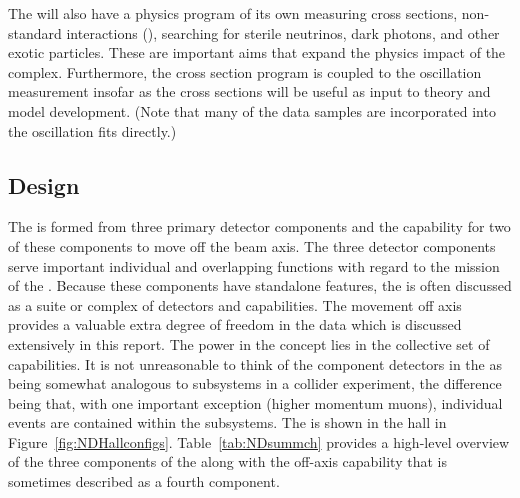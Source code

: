 The   will also have a physics program of its own measuring cross sections, non-standard interactions (), searching for sterile neutrinos, dark photons, and other exotic particles. These are important aims that expand the physics impact of the  complex.  %
Furthermore, the cross section program is coupled to the oscillation measurement insofar as the cross sections will be useful as input to theory and model development.   (Note that many of the  data samples are incorporated into the oscillation fits directly.) %


\subsection{Design} %
\label{sec:appx-nd:BriefOverview}

The   is formed from three primary detector components and the capability for two of these components to move off the beam axis. The three detector components serve important individual and overlapping functions with regard to the mission of the .  Because these components have standalone features, the   is often discussed as a suite or complex of detectors and capabilities.  The movement off axis provides a valuable extra degree of freedom in the data which is discussed extensively in this report.  The power in the   concept lies in the collective set of capabilities.  It is not unreasonable to think of the component detectors in the   as being somewhat analogous to subsystems in a collider experiment, the difference being that, with one important exception (higher momentum muons), individual events are contained within the subsystems.  
The   is shown in the   hall in Figure~\ref{fig:NDHallconfigs}.  Table~\ref{tab:NDsummch} provides a high-level overview of the three components of the   along with the off-axis capability that is sometimes described as a fourth component.  

